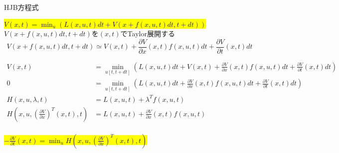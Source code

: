 \documentclass[dvipdfmx,12pt]{beamer}
\begin{document}
    \begin{frame}{HJB方程式}
        \fontsize{6.5pt}{6.5pt}\selectfont

        \colorbox{yellow}{$V(x, t) = \min_{u} \left( L(x, u, t) dt + V \left( x + f(x, u, t) dt, t + dt \right) \right)$} \\
        
        $V \left( x + f(x, u, t) dt, t + dt \right)$を$(x, t)$でTaylor展開する\\
        \begin{equation*}
            V \left( x + f(x, u, t) dt, t + dt \right) \simeq V \left(x, t\right) + \frac{\partial V}{\partial x}\left(x, t\right)f\left(x, u, t\right)dt + \frac{\partial V}{\partial t}\left(x, t\right)dt
        \end{equation*}
 
        
        \begin{align*}
            V(x, t) &= \min_{u[t, t+dt]} \left( L(x, u, t) dt + V \left(x, t\right) + \frac{\partial V}{\partial x}\left(x, t\right)f\left(x, u, t\right)dt + \frac{\partial V}{\partial t}\left(x, t\right)dt \right) \\
            0&=\min_{u[t, t+dt]} \left( L(x, u, t) dt + \frac{\partial V}{\partial x}\left(x, t\right)f\left(x, u, t\right)dt + \frac{\partial V}{\partial t}\left(x, t\right)dt \right) \\
            H(x, u, \lambda, t) &= L(x, u, t) + \lambda^T f(x, u, t) \\
            H\left(x, u, \left( \frac{\partial V}{\partial x} \right)^T\left(x, t\right), t \right) &= L(x, u, t) + \frac{\partial V}{\partial x}\left(x, t\right)f\left(x, u, t\right) \\
        \end{align*}

        \colorbox{yellow}{$-\frac{\partial V}{\partial t}\left(x,t\right) = \min _u H\left(x, u, \left( \frac{\partial V}{\partial x} \right)^T\left(x, t\right), t \right)$} \\

    \end{frame}
\end{document}
